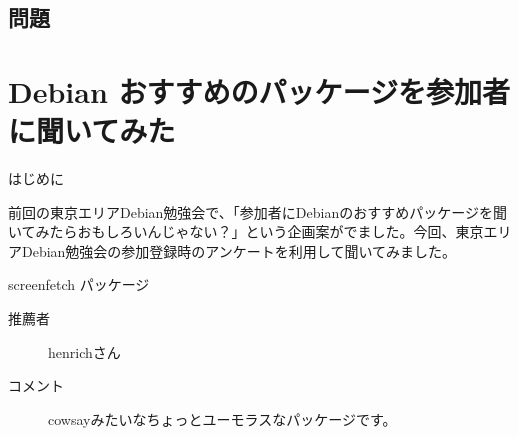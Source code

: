 \subsection{問題}


\fi

\section{Debian おすすめのパッケージを参加者に聞いてみた}

\begin{frame}{はじめに}

  前回の東京エリアDebian勉強会で、「参加者にDebianのおすすめパッケージを聞いてみたらおもしろいんじゃない？」という企画案がでました。今回、東京エリアDebian勉強会の参加登録時のアンケートを利用して聞いてみました。

\end{frame}

\begin{frame}{screenfetch パッケージ}

  \begin{description}
    \item [推薦者] henrichさん
  　\item [コメント] cowsayみたいなちょっとユーモラスなパッケージです。
  \end{description}

\end{frame}


